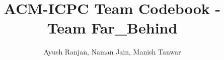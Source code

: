\documentclass[10pt]{article}
\title{\vspace{-4ex}\Large{ACM-ICPC Team Codebook - Team Far\_Behind}}
\author{Ayush Ranjan, Naman Jain, Manish Tanwar}
\date{}
\begin{document}
\begin{landscape}
\begin{multicols}{2}

\maketitle
\vspace{-8ex}
\tableofcontents
\pagestyle{fancy}



\end{multicols}
\end{landscape}
\end{document}

